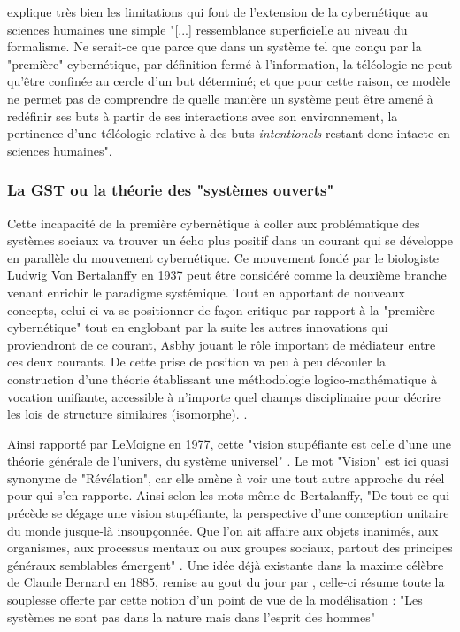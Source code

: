 {\autocite[782]{Pouvreau2013} explique très bien les limitations qui font  de l'extension de la cybernétique au sciences humaines une simple "[...] ressemblance superficielle au niveau du formalisme. Ne serait-ce que parce que dans un système tel que conçu par la "première" cybernétique, par définition fermé à l'information, la téléologie ne peut qu'être confinée au cercle d'un but déterminé; et que pour cette raison, ce modèle ne permet pas de comprendre de quelle manière un système peut être amené à redéfinir ses buts à partir de ses interactions avec son environnement, la pertinence d'une téléologie relative à des buts \textit{intentionels} restant donc intacte en sciences humaines".

\subsubsection{La GST ou la théorie des "systèmes ouverts"}
\label{ssubsec:gst}

Cette incapacité de la première cybernétique à coller aux problématique des systèmes sociaux va trouver un écho plus positif dans un courant qui se développe en parallèle du mouvement cybernétique. Ce mouvement fondé par le biologiste Ludwig Von Bertalanffy en 1937 peut être considéré comme la deuxième branche venant enrichir le paradigme systémique. Tout en apportant de nouveaux concepts, celui ci va se positionner de façon critique par rapport à la "première cybernétique" tout en englobant par la suite les autres innovations qui proviendront de ce courant, Asbhy jouant le rôle important de médiateur entre ces deux courants.\autocite[]{Pouvreau2013} De cette prise de position va peu à peu découler la construction d'une théorie établissant une méthodologie logico-mathématique à vocation unifiante, accessible à n'importe quel champs disciplinaire pour décrire les lois de structure similaires (isomorphe). \autocite{LeMoigne2006a}. 

Ainsi rapporté par LeMoigne en 1977, cette "vision stupéfiante est celle d'une une théorie générale de l'univers, du système universel" \autocite[59]{Lemoigne1977}. Le mot "Vision" est ici quasi synonyme de "Révélation", car elle amène à voir une tout autre approche du réel pour qui s'en rapporte. Ainsi selon les mots même de Bertalanffy, "De tout ce qui précède se dégage une vision stupéfiante, la perspective d'une conception unitaire du monde jusque-là insoupçonnée. Que l'on ait affaire aux objets inanimés, aux organismes, aux processus mentaux ou aux groupes sociaux, partout des principes généraux semblables émergent" \autocite[59]{Lemoigne1977} \autocite[220]{Bertalanffy1949}. Une idée déjà existante dans la maxime célèbre de Claude Bernard en 1885, remise au gout du jour par \autocite{Lemoigne1977}, celle-ci résume toute la souplesse offerte par cette notion d'un point de vue de la modélisation :  "Les systèmes ne sont pas dans la nature mais dans l'esprit des hommes"

}
